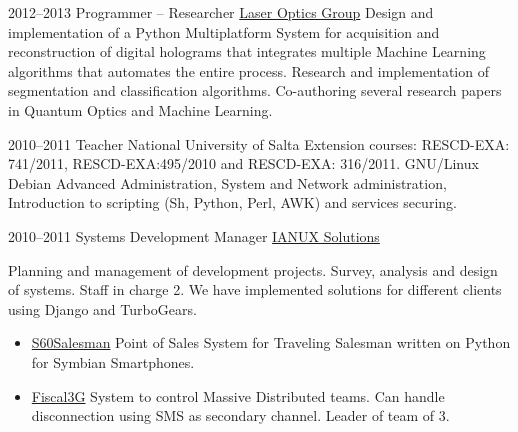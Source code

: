 \documentclass[11pt,a4paper]{moderncv}
\begin{document}
    \cventry
        {2012--2013}
        {Programmer -- Researcher}
        {\href{http://github.com/pointtonull/golsoft}{Laser Optics Group}} {} {}
        {
            Design and implementation of a Python Multiplatform System for %
                acquisition and reconstruction of digital holograms that %
                integrates multiple Machine Learning algorithms that automates %
                the entire process. %
            Research and implementation of segmentation and classification %
                algorithms. %
            Co-authoring several research papers in Quantum Optics and Machine %
                Learning. %
        }

    \cventry          %
        {2010--2011}          %
        {Teacher}          %
        {National University of Salta} {} {}          %
        {          %
            Extension courses: RESCD-EXA: 741/2011,  RESCD-EXA:495/2010 and %
                RESCD-EXA: 316/2011. GNU/Linux Debian Advanced Administration, %
                System and Network administration, Introduction to scripting %
                (Sh, Python, Perl, AWK) and services securing. %
        }          %

    \cventry
        {2010--2011}
        {Systems Development Manager}
        {\href{http://ianux.com.ar}{IANUX Solutions}} {} {}
        {
            Planning and management of development projects. Survey, analysis %
                and design of systems. Staff in charge 2. We have implemented %
                solutions for different clients using Django and TurboGears. %
            \begin {itemize} %
                \item \href{http://github.com/pointtonull/S60Salesman}{S60Salesman} %
                      Point of Sales System for Traveling Salesman written on Python for %
                      Symbian Smartphones. %
                \item \href{http://github.com/pointtonull/Fiscal3G}{Fiscal3G} %
                      System to control Massive Distributed teams. Can handle %
                      disconnection using SMS as secondary channel. Leader of team of %
                      3. %
            \end {itemize} %
        }
\end{document}
